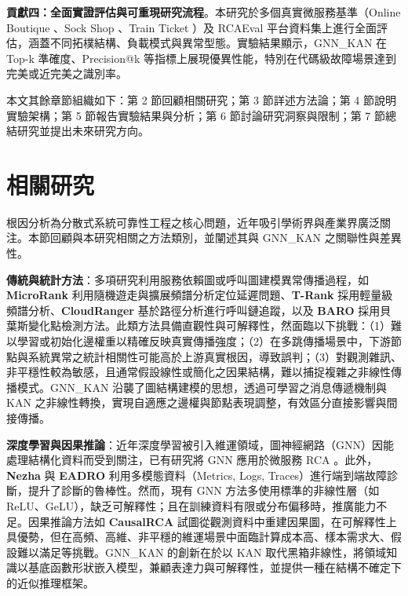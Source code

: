 \documentclass[10pt,a4paper,twocolumn]{article}
\begin{document}
\textbf{貢獻四：全面實證評估與可重現研究流程}。本研究於多個真實微服務基準（Online Boutique \cite{online_boutique}、Sock Shop \cite{sock_shop}、Train Ticket \cite{train_ticket}）及 RCAEval 平台資料集上進行全面評估，涵蓋不同拓樸結構、負載模式與異常型態。實驗結果顯示，GNN\_KAN 在 Top-k 準確度、Precision@k 等指標上展現優異性能，特別在代碼級故障場景達到完美或近完美之識別率。

本文其餘章節組織如下：第 2 節回顧相關研究；第 3 節詳述方法論；第 4 節說明實驗架構；第 5 節報告實驗結果與分析；第 6 節討論研究洞察與限制；第 7 節總結研究並提出未來研究方向。

\section{相關研究}

根因分析為分散式系統可靠性工程之核心問題，近年吸引學術界與產業界廣泛關注。本節回顧與本研究相關之方法類別，並闡述其與 GNN\_KAN 之關聯性與差異性。

\textbf{傳統與統計方法}：多項研究利用服務依賴圖或呼叫圖建模異常傳播過程，如 \textbf{MicroRank} \cite{microrank2021} 利用隨機遊走與擴展頻譜分析定位延遲問題、\textbf{T-Rank} \cite{trank2021} 採用輕量級頻譜分析、\textbf{CloudRanger} \cite{cloudranger2018} 基於路徑分析進行呼叫鏈追蹤，以及 \textbf{BARO} \cite{baro2023} 採用貝葉斯變化點檢測方法。此類方法具備直觀性與可解釋性，然面臨以下挑戰：（1）難以學習或初始化邊權重以精確反映真實傳播強度；（2）在多跳傳播場景中，下游節點與系統異常之統計相關性可能高於上游真實根因，導致誤判；（3）對觀測雜訊、非平穩性較為敏感，且通常假設線性或簡化之因果結構，難以捕捉複雜之非線性傳播模式。GNN\_KAN 沿襲了圖結構建模的思想，透過可學習之消息傳遞機制與 KAN 之非線性轉換，實現自適應之邊權與節點表現調整，有效區分直接影響與間接傳播。

\textbf{深度學習與因果推論}：近年深度學習被引入維運領域，圖神經網路（GNN）因能處理結構化資料而受到關注，已有研究將 GNN 應用於微服務 RCA \cite{gnn_rca2023}。此外，\textbf{Nezha} \cite{nezha2023} 與 \textbf{EADRO} \cite{eadro2023} 利用多模態資料（Metrics, Logs, Traces）進行端到端故障診斷，提升了診斷的魯棒性。然而，現有 GNN 方法多使用標準的非線性層（如 ReLU、GeLU），缺乏可解釋性；且在訓練資料有限或分布偏移時，推廣能力不足。因果推論方法如 \textbf{CausalRCA} \cite{causalrca2023} 試圖從觀測資料中重建因果圖，在可解釋性上具優勢，但在高頻、高維、非平穩的維運場景中面臨計算成本高、樣本需求大、假設難以滿足等挑戰。GNN\_KAN 的創新在於以 KAN 取代黑箱非線性，將領域知識以基底函數形狀嵌入模型，兼顧表達力與可解釋性，並提供一種在結構不確定下的近似推理框架。
\end{document}
